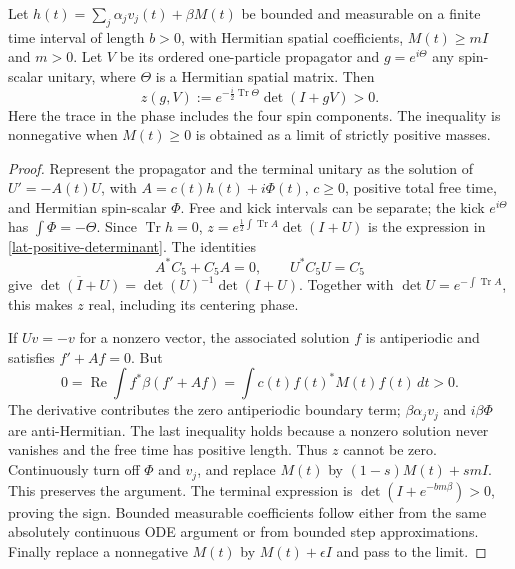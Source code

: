 \begin{lemma}
\label{lat-determinant}
Let $h(t)=\sum_j\alpha_j v_j(t)+\beta M(t)$ be bounded and measurable
on a finite time interval of length $b>0$, with Hermitian spatial
coefficients, $M(t)\ge mI$ and $m>0$.  Let $V$ be its ordered
one-particle propagator and $g=e^{i\Theta}$ any spin-scalar unitary,
where $\Theta$ is a Hermitian spatial matrix.  Then
\begin{equation}
 z(g,V):=e^{-\frac i2\operatorname{Tr}\Theta}\det(I+gV)>0.
 \label{lat-positive-determinant}
\end{equation}
Here the trace in the phase includes the four spin components.  The
inequality is nonnegative when $M(t)\ge0$ is obtained as a limit of
strictly positive masses.
\end{lemma}
\begin{proof}
Represent the propagator and the terminal unitary as the solution of
$U'=-A(t)U$, with $A=c(t)h(t)+i\Phi(t)$, $c\ge0$, positive total
free time, and Hermitian spin-scalar $\Phi$.  Free and kick intervals
can be separate; the kick $e^{i\Theta}$ has $\int\Phi=-\Theta$.
Since $\operatorname{Tr}h=0$,
$z=e^{\frac12\int\operatorname{Tr}A}\det(I+U)$ is the expression
in \eqref{lat-positive-determinant}.
The identities
\[
 A^*C_5+C_5A=0,\qquad U^*C_5U=C_5
\]
give
$\overline{\det(I+U)}=\det(U)^{-1}\det(I+U)$.
Together with $\det U=e^{-\int\operatorname{Tr}A}$, this makes $z$
real, including its centering phase.

If $Uv=-v$ for a nonzero vector, the associated solution $f$ is
antiperiodic and satisfies $f'+Af=0$.  But
\begin{equation}
 0=\operatorname{Re}\int f^*\beta(f'+Af)
      =\int c(t)f(t)^*M(t)f(t)\,dt>0.
 \label{lat-no-zero}
\end{equation}
The derivative contributes the zero antiperiodic boundary term;
$\beta\alpha_jv_j$ and $i\beta\Phi$ are anti-Hermitian.  The last
inequality holds because a nonzero solution never vanishes and the free
time has positive length.  Thus $z$ cannot be zero.
Continuously turn off $\Phi$ and $v_j$, and replace $M(t)$ by
$(1-s)M(t)+smI$.  This preserves the argument.  The terminal expression
is $\det(I+e^{-bm\beta})>0$, proving the sign.  Bounded measurable
coefficients follow either from the same absolutely continuous ODE
argument or from bounded step approximations.  Finally replace a
nonnegative $M(t)$ by $M(t)+\epsilon I$ and pass to the limit.
\end{proof}

